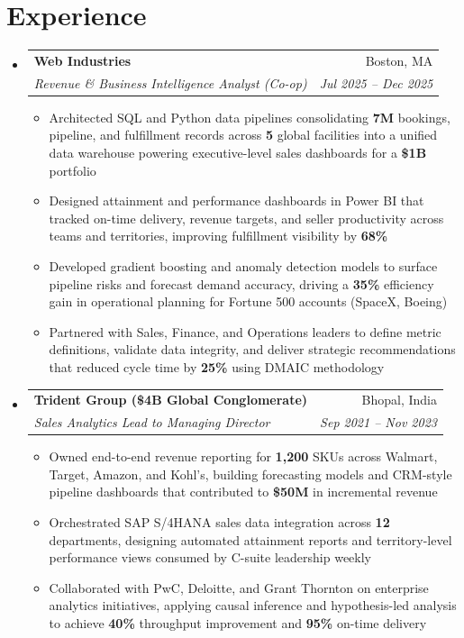 \documentclass[letterpaper,10pt]{article}
\makeatletter
\newcommand{\resumeSubheading}[4]{
  \vspace{1pt}\item
    \begin{tabular*}{0.97\textwidth}[t]{l@{\extracolsep{\fill}}r}
      \textbf{#1} & #2 \\
      \textit{\small#3} & \textit{\small #4} \\
    \end{tabular*}\vspace{-4pt}
}
\newcommand{\resumeItem}[1]{\item\small{{#1 \vspace{-1pt}}}}
\newcommand{\resumeItemListStart}{\begin{itemize}[leftmargin=0.15in, label=$\bullet$]}
\newcommand{\resumeItemListEnd}{\end{itemize}\vspace{-2pt}}
\newcommand{\resumeSubHeadingListStart}{\begin{itemize}[leftmargin=0.15in, label={}]}
\newcommand{\resumeSubHeadingListEnd}{\end{itemize}}
\makeatother
\begin{document}
\section{Experience}
\resumeSubHeadingListStart
\resumeSubheading
{Web Industries}{Boston, MA}
{Revenue \& Business Intelligence Analyst (Co-op)}{Jul 2025 -- Dec 2025}
\resumeItemListStart
\resumeItem{Architected SQL and Python data pipelines consolidating \textbf{7M} bookings, pipeline, and fulfillment records across \textbf{5} global facilities into a unified data warehouse powering executive-level sales dashboards for a \textbf{\$1B} portfolio}
\resumeItem{Designed attainment and performance dashboards in Power BI that tracked on-time delivery, revenue targets, and seller productivity across teams and territories, improving fulfillment visibility by \textbf{68\%}}
\resumeItem{Developed gradient boosting and anomaly detection models to surface pipeline risks and forecast demand accuracy, driving a \textbf{35\%} efficiency gain in operational planning for Fortune 500 accounts (SpaceX, Boeing)}
\resumeItem{Partnered with Sales, Finance, and Operations leaders to define metric definitions, validate data integrity, and deliver strategic recommendations that reduced cycle time by \textbf{25\%} using DMAIC methodology}
\resumeItemListEnd
\resumeSubheading
{Trident Group (\$4B Global Conglomerate)}{Bhopal, India}
{Sales Analytics Lead to Managing Director}{Sep 2021 -- Nov 2023}
\resumeItemListStart
\resumeItem{Owned end-to-end revenue reporting for \textbf{1,200} SKUs across Walmart, Target, Amazon, and Kohl's, building forecasting models and CRM-style pipeline dashboards that contributed to \textbf{\$50M} in incremental revenue}
\resumeItem{Orchestrated SAP S/4HANA sales data integration across \textbf{12} departments, designing automated attainment reports and territory-level performance views consumed by C-suite leadership weekly}
\resumeItem{Collaborated with PwC, Deloitte, and Grant Thornton on enterprise analytics initiatives, applying causal inference and hypothesis-led analysis to achieve \textbf{40\%} throughput improvement and \textbf{95\%} on-time delivery}
\resumeItemListEnd
\resumeSubHeadingListEnd
\end{document}
